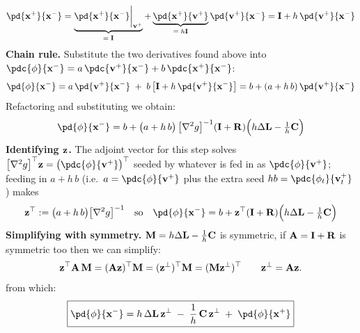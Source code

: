 \begin{derivation}
$$
\pd{\x^+}{\x^-}
=
\underbrace{\pd{\x^+}{\x^-}\bigg|_{\vv^+}}_{=\;\I}
+
\underbrace{\pd{\x^+}{\vv^+}}_{=\;h\I}\pd{\vv^+}{\x^-}
=
\I + h\,\pd{\vv^+}{\x^-}
$$
\textbf{Chain rule.} Substitute the two derivatives found above into
$\pdc{\phi}{\x^-}=a\,\pdc{\vv^+}{\x^-}+b\,\pdc{\x^+}{\x^-}$:
$$
\pd{\phi}{\x^-}
=
a\, \pd{\vv^+}{\x^-}
\;+\;
b\left[\I + h\,\pd{\vv^+}{\x^-}\right] = 
b + (a+h\,b)\,\pd{\vv^+}{\x^-}
$$
Refactoring and substituting we obtain:
$$
\pd{\phi}{\x^-}
=
b
+
\big(a+h\,b\big)\,\big[\nabla^2g\big]^{-1}(\I+\R)\Big(h\Delta\LL-\tfrac1h\C\Big)
$$
\textbf{Identifying $\mathbf{z}$.} The adjoint vector for this step solves $\big[\nabla^2g\big]^{\top}\z = \big(\pdc{\phi}{\vv^+}\big)^\top$ seeded by whatever is fed in as $\pdc{\phi}{\vv^+}$; feeding in $a+h\,b$ (i.e.\ $a=\pdc{\phi}{\vv^+}$ plus the extra seed $hb=\pdc{\phi_t}{\vv_t^+}$) makes
$$
\z^\top := \big(a+h\,b\big)\big[\nabla^2g\big]^{-1}
\quad\text{so}\quad
\pd{\phi}{\x^-} = b + \z^\top(\I+\R)\Big(h\Delta\LL-\tfrac1h\C\Big)
$$
\textbf{Simplifying with symmetry.} $\mathbf{M}=h\Delta\mathbf{L}-\tfrac1h\mathbf{C}$ is symmetric, if $\mathbf{A}=\mathbf{I}+\mathbf{R}$ is symmetric too then we can simplify:
$$
\mathbf{z}^\top\mathbf{A}\,\mathbf{M} = (\mathbf{A}\mathbf{z})^\top\mathbf{M} = (\mathbf{z}^\perp)^\top\mathbf{M} = (\mathbf{M}\mathbf{z}^\perp)^\top
\qquad \mathbf{z}^\perp=\mathbf{A}\mathbf{z}.
$$
from which:
\begin{equation}
    \boxed{
    \pd{\phi}{\x^-} = h\,\Delta\LL\,\z^\perp \;-\; \frac1h\,\C\,\z^\perp \;+\; \pd{\phi}{\x^+}
    }
\end{equation}
\end{derivation}

